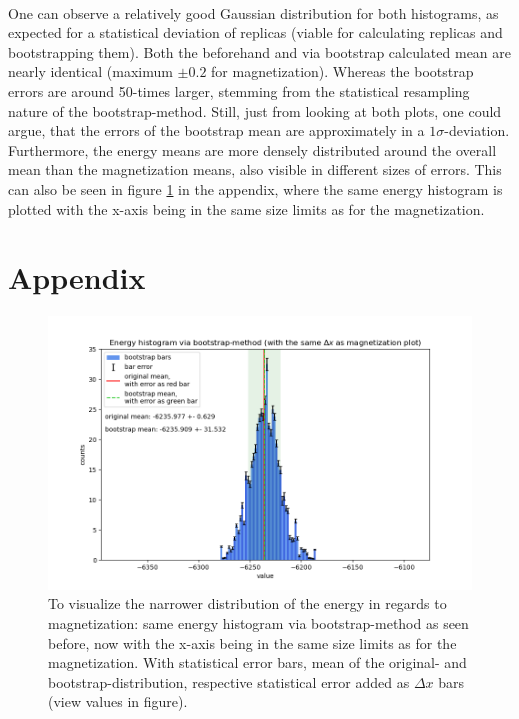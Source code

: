 \documentclass[11pt, letterpaper, onecolumn]{article}
\begin{document}
	\\
	One can observe a relatively good Gaussian distribution for both histograms, as expected for a statistical deviation of replicas (viable for calculating replicas and bootstrapping them). Both the beforehand and via bootstrap calculated mean are nearly identical (maximum $\pm0.2$ for magnetization). Whereas the bootstrap errors are around 50-times larger, stemming from the statistical resampling nature of the bootstrap-method. Still, just from looking at both plots, one could argue, that the errors of the bootstrap mean are approximately in a $1\sigma$-deviation. \\
	Furthermore, the energy means are more densely distributed around the overall mean than the magnetization means, also visible in different sizes of errors. This can also be seen in figure \ref{fig:app1} in the appendix, where the same energy histogram is plotted with the x-axis being in the same size limits as for the magnetization.

	
	
	
	
	

\newpage

	
\section{Appendix} \label{sec:appendix}

	\begin{figure} [h] 
	\begin{center}
	\includegraphics[width=17cm]{"energy-mag_histo_final.png"}
\caption{To visualize the narrower distribution of the energy in regards to magnetization: same energy histogram via bootstrap-method as seen before, now with the x-axis being in the same size limits as for the magnetization. With statistical error bars, mean of the original- and bootstrap-distribution, respective statistical error added as $\Delta x$ bars (view values in figure).}	\label{fig:app1}
	\end{center}
	\end{figure}
\end{document}
